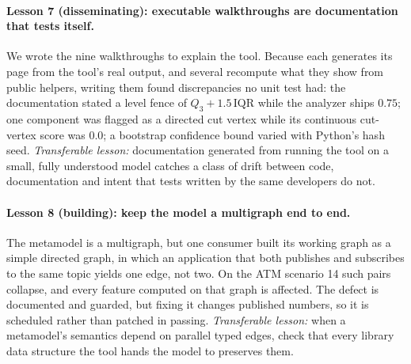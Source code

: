 \paragraph{Lesson 7 (disseminating): executable walkthroughs are documentation that tests itself.} We wrote the nine walkthroughs to explain the tool. Because each generates its page from the tool's real output, and several recompute what they show from public helpers, writing them found discrepancies no unit test had: the documentation stated a level fence of $Q_3 + 1.5\,\mathrm{IQR}$ while the analyzer ships $0.75$; one component was flagged as a directed cut vertex while its continuous cut-vertex score was 0.0; a bootstrap confidence bound varied with Python's hash seed. \emph{Transferable lesson:} documentation generated from running the tool on a small, fully understood model catches a class of drift between code, documentation and intent that tests written by the same developers do not.

\paragraph{Lesson 8 (building): keep the model a multigraph end to end.} The metamodel is a multigraph, but one consumer built its working graph as a simple directed graph, in which an application that both publishes and subscribes to the same topic yields one edge, not two. On the ATM scenario 14 such pairs collapse, and every feature computed on that graph is affected. The defect is documented and guarded, but fixing it changes published numbers, so it is scheduled rather than patched in passing. \emph{Transferable lesson:} when a metamodel's semantics depend on parallel typed edges, check that every library data structure the tool hands the model to preserves them.
